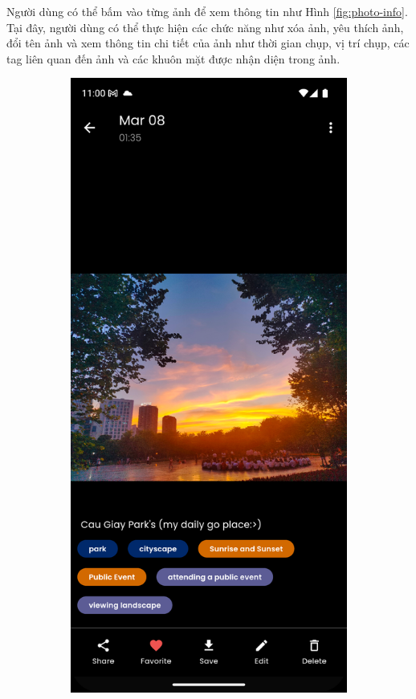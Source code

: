 Người dùng có thể bấm vào từng ảnh để xem thông tin như Hình \ref{fig:photo-info}. Tại đây, người dùng có thể thực hiện các chức năng như xóa ảnh, yêu thích ảnh, đổi tên ảnh và xem thông tin chi tiết của ảnh như thời gian chụp, vị trí chụp, các tag liên quan đến ảnh và các khuôn mặt được nhận diện trong ảnh.

\begin{figure}[H]
    \centering
    \begin{subfigure}{0.48\textwidth}
        \includegraphics[width=1\linewidth]{figures/c4/4-2/image.png} 

\end{subfigure}
\end{figure}
